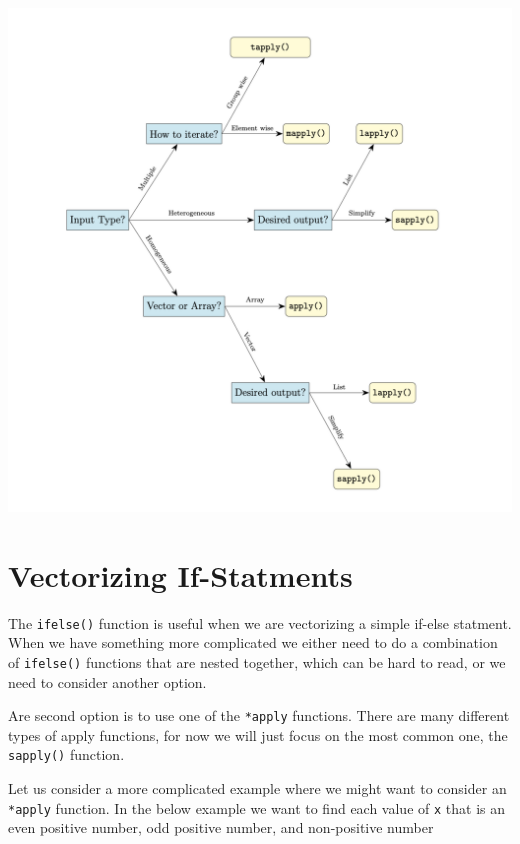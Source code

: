 \documentclass[
]{book}
\begin{document}
\includegraphics{images/apply_flowchart.png}

\hypertarget{vectorizeifelse}{%
\section{Vectorizing If-Statments}\label{vectorizeifelse}}

The \texttt{ifelse()} function is useful when we are vectorizing a simple if-else statment. When we have something more complicated we either need to do a combination of \texttt{ifelse()} functions that are nested together, which can be hard to read, or we need to consider another option.

Are second option is to use one of the \texttt{*apply} functions. There are many different types of apply functions, for now we will just focus on the most common one, the \texttt{sapply()} function.

Let us consider a more complicated example where we might want to consider an \texttt{*apply} function. In the below example we want to find each value of \texttt{x} that is an even positive number, odd positive number, and non-positive number
\end{document}
